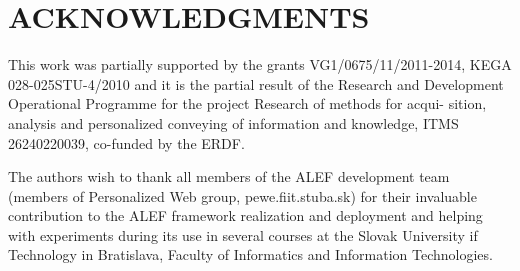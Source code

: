 \documentclass[a4, conference]{IEEEtran}
\begin{document}
\section*{ACKNOWLEDGMENTS}%
%  
This work was partially supported by the grants VG1/0675/11/2011-2014, KEGA 028-025STU-4/2010 and it is the partial result of the Research and Development Operational Programme for the project Research of methods for acqui- sition, analysis and personalized conveying of information and knowledge, ITMS 26240220039, co-funded by the ERDF.

The authors wish to thank all members of the ALEF development team (members of Personalized Web group, pewe.fiit.stuba.sk) for their invaluable contribution to the ALEF framework realization and deployment and helping with experiments during its use in several courses at the Slovak University if Technology in Bratislava, Faculty of Informatics and Information Technologies. 


\end{document}
